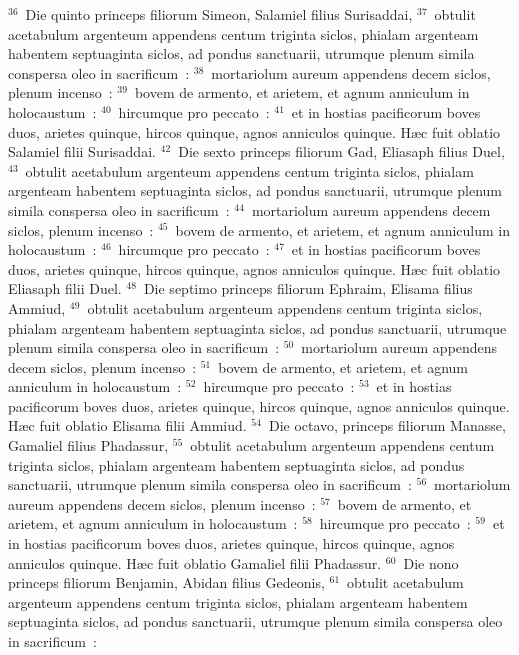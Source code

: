 ${}^{36}$~Die quinto princeps filiorum Simeon, Salamiel filius Surisaddai,
${}^{37}$~obtulit acetabulum argenteum appendens centum triginta siclos, phialam argenteam habentem septuaginta siclos, ad pondus sanctuarii, utrumque plenum simila conspersa oleo in sacrificum~:
${}^{38}$~mortariolum aureum appendens decem siclos, plenum incenso~:
${}^{39}$~bovem de armento, et arietem, et agnum anniculum in holocaustum~:
${}^{40}$~hircumque pro peccato~:
${}^{41}$~et in hostias pacificorum boves duos, arietes quinque, hircos quinque, agnos anniculos quinque. H\ae c fuit oblatio Salamiel filii Surisaddai.
${}^{42}$~Die sexto princeps filiorum Gad, Eliasaph filius Duel,
${}^{43}$~obtulit acetabulum argenteum appendens centum triginta siclos, phialam argenteam habentem septuaginta siclos, ad pondus sanctuarii, utrumque plenum simila conspersa oleo in sacrificum~:
${}^{44}$~mortariolum aureum appendens decem siclos, plenum incenso~:
${}^{45}$~bovem de armento, et arietem, et agnum anniculum in holocaustum~:
${}^{46}$~hircumque pro peccato~:
${}^{47}$~et in hostias pacificorum boves duos, arietes quinque, hircos quinque, agnos anniculos quinque. H\ae c fuit oblatio Eliasaph filii Duel.
${}^{48}$~Die septimo princeps filiorum Ephraim, Elisama filius Ammiud,
${}^{49}$~obtulit acetabulum argenteum appendens centum triginta siclos, phialam argenteam habentem septuaginta siclos, ad pondus sanctuarii, utrumque plenum simila conspersa oleo in sacrificum~:
${}^{50}$~mortariolum aureum appendens decem siclos, plenum incenso~:
${}^{51}$~bovem de armento, et arietem, et agnum anniculum in holocaustum~:
${}^{52}$~hircumque pro peccato~:
${}^{53}$~et in hostias pacificorum boves duos, arietes quinque, hircos quinque, agnos anniculos quinque. H\ae c fuit oblatio Elisama filii Ammiud.
${}^{54}$~Die octavo, princeps filiorum Manasse, Gamaliel filius Phadassur,
${}^{55}$~obtulit acetabulum argenteum appendens centum triginta siclos, phialam argenteam habentem septuaginta siclos, ad pondus sanctuarii, utrumque plenum simila conspersa oleo in sacrificum~:
${}^{56}$~mortariolum aureum appendens decem siclos, plenum incenso~:
${}^{57}$~bovem de armento, et arietem, et agnum anniculum in holocaustum~:
${}^{58}$~hircumque pro peccato~:
${}^{59}$~et in hostias pacificorum boves duos, arietes quinque, hircos quinque, agnos anniculos quinque. H\ae c fuit oblatio Gamaliel filii Phadassur.
${}^{60}$~Die nono princeps filiorum Benjamin, Abidan filius Gedeonis,
${}^{61}$~obtulit acetabulum argenteum appendens centum triginta siclos, phialam argenteam habentem septuaginta siclos, ad pondus sanctuarii, utrumque plenum simila conspersa oleo in sacrificum~:
